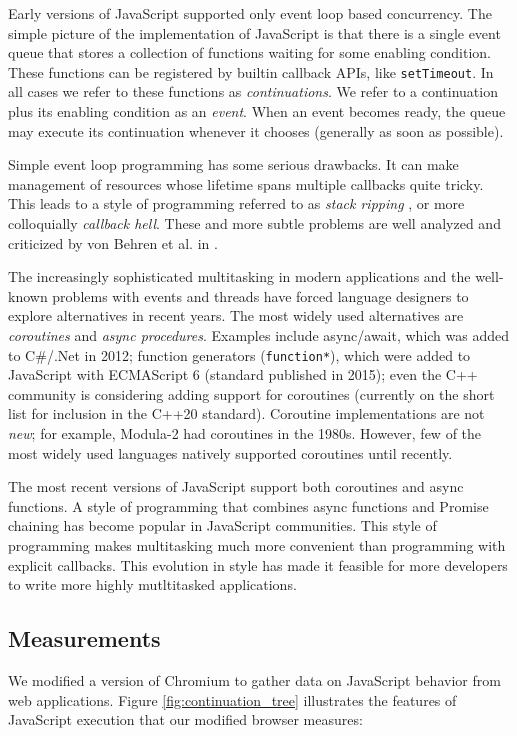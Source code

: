 \documentclass[sigplan,10pt,review,anonymous]{acmart}\settopmatter{printfolios=true,printccs=false,printacmref=false}
\begin{document}
Early versions of JavaScript supported only event loop based concurrency.
The simple picture of the implementation of JavaScript is that there is a single event queue that stores a collection of functions waiting for some enabling condition.
These functions can be registered by builtin callback APIs, like \texttt{setTimeout}.
In all cases we refer to these functions as \emph{continuations}.
We refer to a continuation plus its enabling condition as an \emph{event}.
When an event becomes ready, the queue may execute its continuation whenever it chooses (generally as soon as possible).

Simple event loop programming has some serious drawbacks.
It can make management of resources whose lifetime spans multiple callbacks quite tricky.
This leads to a style of programming referred to as \emph{stack ripping} \cite{Adya2002}, or more colloquially \emph{callback hell}.
These and more subtle problems are well analyzed and criticized by von Behren et al. in \cite{Behren2003a}.

The increasingly sophisticated multitasking in modern applications and the well-known problems with events and threads have forced language designers to explore alternatives in recent years.
The most widely used alternatives are \emph{coroutines} and \emph{async procedures}.
Examples include async/await, which was added to C\#/.Net in 2012; function generators (\texttt{function*}), which were added to JavaScript with ECMAScript 6 (standard published in 2015); even the C++ community is considering adding support for coroutines (currently on the short list for inclusion in the C++20 standard).
Coroutine implementations are not \emph{new}; for example, Modula-2 had coroutines in the 1980s.
However, few of the most widely used languages natively supported coroutines until recently.

The most recent versions of JavaScript support both coroutines and async functions.
A style of programming that combines async functions and Promise chaining has become popular in JavaScript communities.
This style of programming makes multitasking much more convenient than programming with explicit callbacks.
This evolution in style has made it feasible for more developers to write more highly mutltitasked applications.

\subsection{Measurements}

We modified a version of Chromium to gather data on JavaScript behavior from web applications.
Figure \ref{fig:continuation_tree} illustrates the features of JavaScript execution that our modified browser measures:
\end{document}
